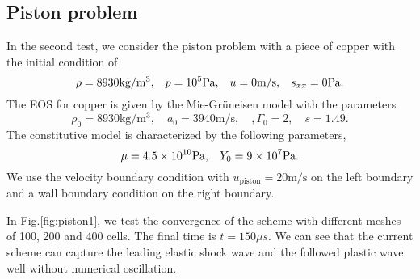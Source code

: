 \documentclass[review]{elsarticle}
\begin{document}
\subsection{Piston problem}
In the second test, we consider the  piston problem \cite{maire2007cell} with a piece of copper with the initial condition of
\begin{equation}
  \rho = 8930 \text{kg}/\text{m}^3, \hspace{0.3cm}  p = 10^5 \text{Pa}, \hspace{0.3cm}  u = 0 \text{m}/\text{s},\hspace{0.3cm}  s_{xx} = 0 \text{Pa}.
\end{equation}
The EOS for copper is given by  the Mie-Gr\"uneisen model with the parameters
\begin{equation}
  \rho_0 = 8930 \text{kg}/\text{m}^3, \quad a_0 = 3940\text{m}/\text{s}, \quad , \Gamma_0 = 2, \quad  s = 1.49.
\end{equation}
The constitutive model is characterized by the following parameters,
\begin{equation}
  \mu = 4.5\times 10^{10}\text{Pa}, \hspace{0.3cm} Y_0 = 9\times 10^7 \text{Pa}.
\end{equation}
We use the velocity boundary condition with $u_{\text{piston}} = 20 \text{m}/\text{s}$ on the left boundary  and a  wall boundary condition on the right boundary.

In Fig.\ref{fig:piston1}, we test the convergence of the scheme with different meshes of 100, 200 and 400 cells. The final time is $t = 150 \mu s $.  We can  see that the current scheme can capture the leading elastic shock wave and the followed plastic wave well without numerical oscillation.
\end{document}
